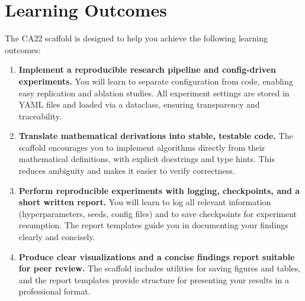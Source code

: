 \documentclass[11pt]{article}
\begin{document}
\section{Learning Outcomes}
The CA22 scaffold is designed to help you achieve the following learning outcomes:
\begin{enumerate}
  \item \textbf{Implement a reproducible research pipeline and config-driven experiments.} You will learn to separate configuration from code, enabling easy replication and ablation studies. All experiment settings are stored in YAML files and loaded via a dataclass, ensuring transparency and traceability.
  \item \textbf{Translate mathematical derivations into stable, testable code.} The scaffold encourages you to implement algorithms directly from their mathematical definitions, with explicit docstrings and type hints. This reduces ambiguity and makes it easier to verify correctness.
  \item \textbf{Perform reproducible experiments with logging, checkpoints, and a short written report.} You will learn to log all relevant information (hyperparameters, seeds, config files) and to save checkpoints for experiment resumption. The report templates guide you in documenting your findings clearly and concisely.
  \item \textbf{Produce clear visualizations and a concise findings report suitable for peer review.} The scaffold includes utilities for saving figures and tables, and the report templates provide structure for presenting your results in a professional format.
\end{enumerate}
\end{document}
